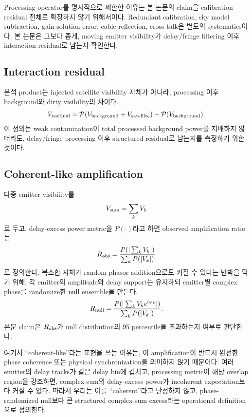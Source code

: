 \documentclass[11pt,a4paper]{article}
\newcommand{\vis}{V}
\begin{document}
Processing operator를 명시적으로 제한한 이유는 본 논문의 claim을 calibration residual 전체로 확장하지 않기 위해서이다.
Redundant calibration, sky model subtraction, gain solution error, cable reflection, cross-talk은 별도의 systematics이다.
본 논문은 그보다 좁게, moving emitter visibility가 delay/fringe filtering 이후 interaction residual로 남는지 확인한다.

\subsection{Interaction residual}

분석 product는 injected satellite visibility 자체가 아니라, processing 이후 background와 dirty visibility의 차이다.
\begin{equation}
  \vis_{\rm residual}
  =
  {\cal P}(\vis_{\rm background}+\vis_{\rm satellite})
  -
  {\cal P}(\vis_{\rm background}).
\end{equation}
이 정의는 weak contamination이 total processed background power를 지배하지 않더라도, delay/fringe processing 이후 structured residual로 남는지를 측정하기 위한 것이다.

\subsection{Coherent-like amplification}

다중 emitter visibility를
\begin{equation}
  \vis_{\rm sum}=\sum_k \vis_k
\end{equation}
로 두고, delay-excess power metric을 $P(\cdot)$라고 하면 observed amplification ratio는
\begin{equation}
  R_{\rm obs}
  =
  \frac{P(|\sum_k \vis_k|)}{\sum_k P(|\vis_k|)}
\end{equation}
로 정의한다.
복소합 자체가 random phasor addition으로도 커질 수 있다는 반박을 막기 위해, 각 emitter의 amplitude와 delay support는 유지하되 emitter별 complex phase를 randomize한 null ensemble을 만든다.
\begin{equation}
  R_{\rm null}
  =
  \frac{P(|\sum_k \vis_k e^{i\varphi_k}|)}{\sum_k P(|\vis_k|)}.
\end{equation}
본문 claim은 $R_{\rm obs}$가 null distribution의 95 percentile을 초과하는지 여부로 판단한다.

여기서 ``coherent-like''라는 표현을 쓰는 이유는, 이 amplification이 반드시 완전한 phase coherence 또는 physical synchronization을 의미하지 않기 때문이다.
여러 emitter의 delay tracks가 같은 delay bin에 겹치고, processing metric이 해당 overlap region을 강조하면, complex sum의 delay-excess power가 incoherent expectation보다 커질 수 있다.
따라서 우리는 이를 ``coherent''라고 단정하지 않고, phase-randomized null보다 큰 structured complex-sum excess라는 operational definition으로 정의한다.
\end{document}
